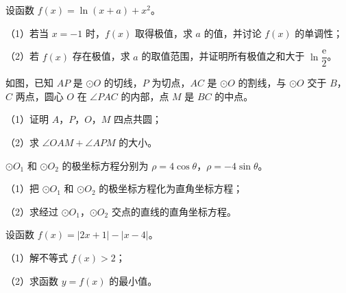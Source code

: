 \begin{question}
设函数 $f(x)=\ln(x+a)+x^2$。

（1）若当 $x=-1$ 时，$f(x)$ 取得极值，求 $a$ 的值，并讨论 $f(x)$ 的单调性；

（2）若 $f(x)$ 存在极值，求 $a$ 的取值范围，并证明所有极值之和大于 $\ln\dfrac{\mathrm e}{2}$。

\Needspace{0.4\textheight}
\end{question}
\begin{question}
如图，已知 $AP$ 是 $\odot O$ 的切线，$P$ 为切点，$AC$ 是 $\odot O$ 的割线，与 $\odot O$ 交于 $B$，$C$ 两点，圆心 $O$ 在 $\angle PAC$ 的内部，点 $M$ 是 $BC$ 的中点。

（1）证明 $A$，$P$，$O$，$M$ 四点共圆；

（2）求 $\angle OAM+\angle APM$ 的大小。
\nopagebreak[4]
\begin{center}\end{center}
\nopagebreak[4]
\end{question}

\begin{question}
$\odot O_1$ 和 $\odot O_2$ 的极坐标方程分别为 $\rho=4\cos\theta$，$\rho=-4\sin\theta$。

（1）把 $\odot O_1$ 和 $\odot O_2$ 的极坐标方程化为直角坐标方程；

（2）求经过 $\odot O_1$，$\odot O_2$ 交点的直线的直角坐标方程。

\end{question}
\begin{question}
设函数 $f(x)=|2x+1|-|x-4|$。

（1）解不等式 $f(x)>2$；

（2）求函数 $y=f(x)$ 的最小值。

\end{question}